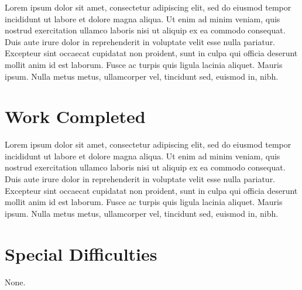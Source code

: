 \documentclass[12pt,a4paper,twoside,openright]{report}
\begin{document}
Lorem ipsum dolor sit amet, consectetur adipiscing elit, sed do eiusmod tempor incididunt ut labore et dolore magna aliqua. Ut enim ad minim veniam, quis nostrud exercitation ullamco laboris nisi ut aliquip ex ea commodo consequat. Duis aute irure dolor in reprehenderit in voluptate velit esse nulla pariatur. Excepteur sint occaecat cupidatat non proident, sunt in culpa qui officia deserunt mollit anim id est laborum.
Fusce ac turpis quis ligula lacinia aliquet. Mauris ipsum. Nulla metus metus, ullamcorper vel, tincidunt sed, euismod in, nibh.

\section*{Work Completed}

Lorem ipsum dolor sit amet, consectetur adipiscing elit, sed do eiusmod tempor incididunt ut labore et dolore magna aliqua. Ut enim ad minim veniam, quis nostrud exercitation ullamco laboris nisi ut aliquip ex ea commodo consequat. Duis aute irure dolor in reprehenderit in voluptate velit esse nulla pariatur. Excepteur sint occaecat cupidatat non proident, sunt in culpa qui officia deserunt mollit anim id est laborum.
Fusce ac turpis quis ligula lacinia aliquet. Mauris ipsum. Nulla metus metus, ullamcorper vel, tincidunt sed, euismod in, nibh.

\section*{Special Difficulties}

None.

\newpage 

\tableofcontents


\newpage
{}
\setcounter{page}{1}







\end{document}
